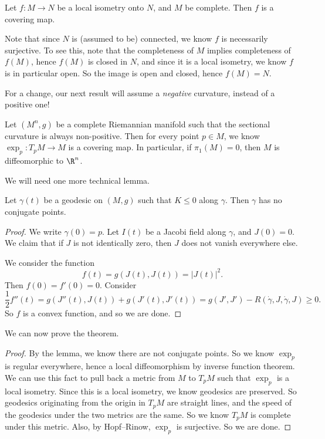 \documentclass[a4paper]{article}
\begin{document}
\begin{cor}
  Let $f: M \to N$ be a local isometry onto $N$, and $M$ be complete. Then $f$ is a covering map.
\end{cor}
Note that since $N$ is (assumed to be) connected, we know $f$ is necessarily surjective. To see this, note that the completeness of $M$ implies completeness of $f(M)$, hence $f(M)$ is closed in $N$, and since it is a local isometry, we know $f$ is in particular open. So the image is open and closed, hence $f(M) = N$.

For a change, our next result will assume a \emph{negative} curvature, instead of a positive one!
\begin{thm}
  Let $(M^n, g)$ be a complete Riemannian manifold such that the sectional curvature is always non-positive. Then for every point $p \in M$, we know $\exp_p: T_p M \to M$ is a covering map. In particular, if $\pi_1(M) = 0$, then $M$ is diffeomorphic to $\R^n$.
\end{thm}

We will need one more technical lemma.
\begin{lemma}
  Let $\gamma(t)$ be a geodesic on $(M, g)$ such that $K \leq 0$ along $\gamma$. Then $\gamma$ has no conjugate points.
\end{lemma}

\begin{proof}
  We write $\gamma(0) = p$. Let $I(t)$ be a Jacobi field along $\gamma$, and $J(0) = 0$. We claim that if $J$ is not identically zero, then $J$ does not vanish everywhere else.

  We consider the function
  \[
    f(t) = g(J(t), J(t)) = |J(t)|^2.
  \]
  Then $f(0) = f'(0) = 0$. Consider
  \[
    \frac{1}{2} f''(t) = g(J''(t), J(t)) + g(J'(t), J'(t)) = g(J', J') - R(\dot{\gamma}, J, \dot{\gamma}, J) \geq 0.
  \]
  So $f$ is a convex function, and so we are done.
\end{proof}

We can now prove the theorem.
\begin{proof}
  By the lemma, we know there are not conjugate points. So we know $\exp_p$ is regular everywhere, hence a local diffeomorphism by inverse function theorem. We can use this fact to pull back a metric from $M$ to $T_p M$ such that $\exp_p$ is a local isometry. Since this is a local isometry, we know geodesics are preserved. So geodesics originating from the origin in $T_p M$ are straight lines, and the speed of the geodesics under the two metrics are the same. So we know $T_p M$ is complete under this metric. Also, by Hopf--Rinow, $\exp_p$ is surjective. So we are done.
\end{proof}
\end{document}
